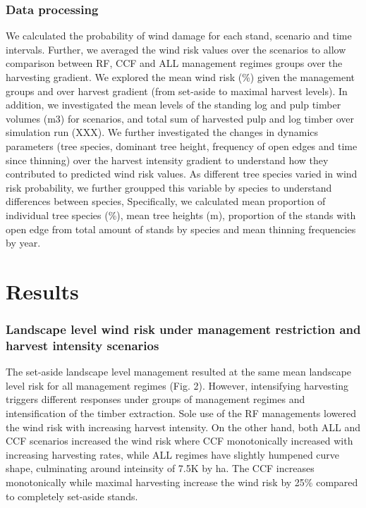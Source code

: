 \documentclass[]{elsarticle} %
\begin{document}
\subsubsection{Data processing}\label{data-processing}

We calculated the probability of wind damage for each stand, scenario
and time intervals. Further, we averaged the wind risk values over the
scenarios to allow comparison between RF, CCF and ALL management regimes
groups over the harvesting gradient. We explored the mean wind risk (\%)
given the management groups and over harvest gradient (from set-aside to
maximal harvest levels). In addition, we investigated the mean levels of
the standing log and pulp timber volumes (m3) for scenarios, and total
sum of harvested pulp and log timber over simulation run (XXX). We
further investigated the changes in dynamics parameters (tree species,
dominant tree height, frequency of open edges and time since thinning)
over the harvest intensity gradient to understand how they contributed
to predicted wind risk values. As different tree species varied in wind
risk probability, we further groupped this variable by species to
understand differences between species, Specifically, we calculated mean
proportion of individual tree species (\%), mean tree heights (m),
proportion of the stands with open edge from total amount of stands by
species and mean thinning frequencies by year.

\section{Results}\label{results}

\subsubsection{Landscape level wind risk under management restriction
and harvest intensity
scenarios}\label{landscape-level-wind-risk-under-management-restriction-and-harvest-intensity-scenarios}

The set-aside landscape level management resulted at the same mean
landscape level risk for all management regimes (Fig. 2). However,
intensifying harvesting triggers different responses under groups of
management regimes and intensification of the timber extraction. Sole
use of the RF managements lowered the wind risk with increasing harvest
intensity. On the other hand, both ALL and CCF scenarios increased the
wind risk where CCF monotonically increased with increasing harvesting
rates, while ALL regimes have slightly humpened curve shape, culminating
around inteinsity of 7.5K by ha. The CCF increases monotonically while
maximal harvesting increase the wind risk by 25\% compared to completely
set-aside stands.
\end{document}

